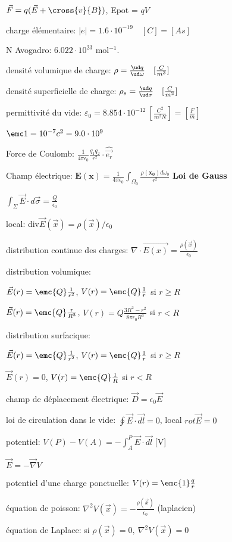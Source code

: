  \squishlist
  \item $\vec F = q ( \vec E + \cross{v}{B})$, Epot = $qV$
  \item charge élémentaire: $|e| = 1.6 \cdot 10^{-19} \quad [C] = [As]$
  \item N Avogadro: $6.022\cdot10^{23}$ mol$^{-1}$.
  \item densité volumique de charge: $\rho = \frac{\ud q}{\ud \omega} \quad [\frac{C}{m^3}]$
  \item densité superficielle de charge: $\rho_s = \frac{\ud q}{\ud \sigma} \quad [\frac{C}{m^2}]$
  \item permittivité du vide: $\varepsilon_0 = 8.854 \cdot 10^{-12} \ [\frac{C^2}{m^2 N}] = [\frac{F}{m}]$
  \item $\emc 1 = 10^{-7} c^2 = 9.0 \cdot 10^9$
 \squishend
 
  \squishlist
     \item Force de Coulomb: $\frac{1}{4\pi\epsilon_0} \frac{q_1 q_2}{r^2}\cdot \hat{\vec{e_r}}$
     \item Champ électrique: $\mathbf{E(x)} = \frac{1}{4\pi\epsilon_0} \int_{\Omega_0} \frac{\rho(\mathbf{x_0})d\omega_0}{r^2}$ 
  \squishend
\textbf{Loi de Gauss}
 \squishlist
  \item $\int_{\Sigma} \vec{E}\cdot d\vec{\sigma} = \frac{Q}{\epsilon_0}$
  \item local: div$\vec{E}(\vec{x}) = \rho(\vec{x})/\epsilon_0$
  \item distribution continue des charges: $\nabla\cdot \vec{E(x)}= \frac{\rho(\vec{x})}{\epsilon_0}$
  \item distribution volumique:
    \squishlist
     \item $\vec{E}(r)=\emc{Q} \frac{1}{r^2} $, $V(r)=\emc{Q}\frac{1}{r}$ si $r\geqslant R$ 
     \item $\vec{E}(r)=\emc{Q} \frac{r}{R^3}$, $V(r) = Q\frac{3R^2-r^2}{8\pi\epsilon_0 R^3}$ si $r<R$
    \squishend
  \item distribution surfacique:
   \squishlist
    \item $\vec{E}(r)=\emc{Q} \frac{1}{r^2} $, $V(r)=\emc{Q}\frac{1}{r}$ si $r\geqslant R$
    \item $\vec{E}(r)=0$, $V(r)=\emc{Q} \frac{1}{R}$ si $r<R$
   \squishend
    \item champ de déplacement électrique: $\vec{D}=\epsilon_0 \vec{E}$
    \item loi de circulation dans le vide: $\oint \vec{E}\cdot \vec{dl} = 0$, local $rot\vec{E}=0$	
    \item potentiel: $V(P)-V(A)= -\int_A^P \vec{E}\cdot\vec{dl}$ [V]
    \item $\vec{E}=-\vec{\nabla} V$
    \item potentiel d'une charge ponctuelle: $V(r)= \emc{1}\frac{q}{r}$
    \item équation de poisson: $\nabla^2 V(\vec{x}) = -\frac{\rho(\vec{x})}{\epsilon_0}$ (laplacien)
    \item équation de Laplace: si $\rho(\vec{x}) = 0, \ \nabla^2 V(\vec{x}) = 0$
 \squishend
 

